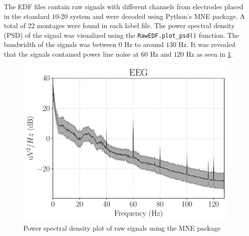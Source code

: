 

The EDF files contain raw signals with different channels from electrodes placed in the standard $10$-$20$ system and were decoded using Python's MNE package. A total of $22$ montages were found in each label file. The power spectral density (PSD) of the signal was visualized using the \verb+RawEDF.plot_psd()+ function. The bandwidth of the signals was between $0$ Hz to around $130$ Hz. It was revealed that the signals contained power line noise at $60$ Hz and $120$ Hz as seen in \cref{fig:psd}. 

\begin{figure}[!ht]
	\centering
	\includegraphics[width=0.7\linewidth]{pictures/psd.pdf}
	\caption[Power spectral density plot of raw EEG signals]{Power spectral density plot of raw signals using the MNE package}\label{fig:psd}  
\end{figure}

